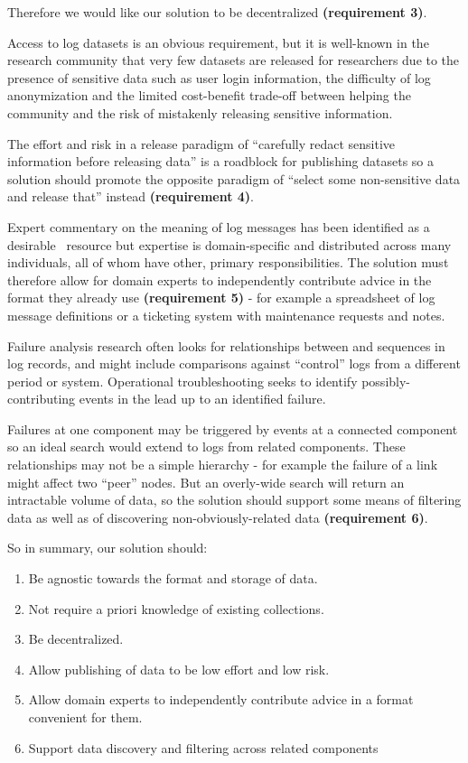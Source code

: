 Therefore we would like our solution to be decentralized 
\textbf{(requirement 3)}.

Access to log datasets is an obvious requirement, but it is well-known in the research 
community that very few datasets are released for researchers
due to the presence of sensitive data such as user login information, 
the difficulty of log anonymization and the limited cost-benefit 
trade-off between helping the community and the risk of mistakenly 
releasing sensitive information. 

The effort and risk in a release paradigm of ``carefully redact 
sensitive information before releasing data'' is a roadblock for 
publishing datasets so a solution should promote the opposite 
paradigm of ``select some non-sensitive data and release that'' 
instead \textbf{(requirement 4)}.

Expert commentary on the meaning of log messages has been identified as
a desirable~\cite{CUG2016BoF} resource but expertise is domain-specific
and distributed across many individuals, all of whom have other, primary 
responsibilities. The solution must therefore allow for
domain experts to independently contribute advice in the format they
already use \textbf{(requirement 5)} - for example a
spreadsheet of log message definitions or a ticketing system with
maintenance requests and notes.

Failure analysis research often looks for relationships between 
and sequences in log records, and might include comparisons against 
``control'' logs from a different period or system. Operational 
troubleshooting seeks to identify possibly-contributing events in the lead 
up to an identified failure. 

Failures at one component may be triggered by events 
at a connected component so an ideal search would extend to logs from
related components. These relationships may not be a simple hierarchy
 - for example the failure of a link might affect two ``peer'' nodes.
But an overly-wide search will return an intractable volume of data, so
the solution should support some means of filtering data as well as 
of discovering non-obviously-related data \textbf{(requirement 6)}.

So in summary, our solution should:
\begin{enumerate}
\item Be agnostic towards the format and storage of data.
\item Not require a priori knowledge of existing collections.
\item Be decentralized.
\item Allow publishing of data to be low effort and low risk.
\item Allow domain experts to independently contribute advice 
      in a format convenient for them.
\item Support data discovery and filtering across related components
\end{enumerate}

